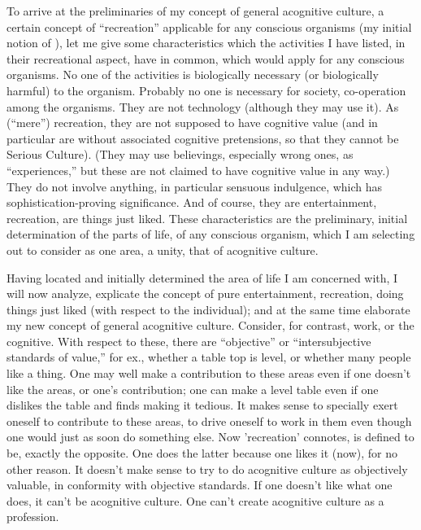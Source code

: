 To arrive at the preliminaries of my concept of general acognitive culture, a certain concept of \enquote{recreation} applicable for any conscious organisms (my initial notion of ), let me give some characteristics which the activities I have listed, in their recreational aspect, have in common, which would apply for any conscious organisms. No one of the activities is biologically necessary (or biologically harmful) to the organism. Probably no one is necessary for society, co-operation among the organisms. They are not technology (although they may use it). As (\enquote{mere}) recreation, they are not supposed to have cognitive value (and in particular are without associated cognitive pretensions, so that they cannot be Serious Culture). (They may use believings, especially wrong ones, as \enquote{experiences,} but these are not claimed to have cognitive value in any way.) They do not involve anything, in particular sensuous indulgence, which has sophistication-proving significance. And of course, they are entertainment, recreation, are things just liked. These characteristics are the preliminary, initial determination of the parts of life, of any conscious organism, which I am selecting out to consider as one area, a unity, that of acognitive culture.

Having located and initially determined the area of life I am concerned with, I will now analyze, explicate the concept of pure entertainment, recreation, doing things just liked (with respect to the individual); and at the same time elaborate my new concept of general acognitive culture. Consider, for contrast, work, or the cognitive. With respect to these, there are \enquote{objective} or \enquote{intersubjective standards of value,} for ex., whether a table top is level, or whether many people like a thing. One may well make a contribution to these areas even if one doesn't like the areas, or one's contribution; one can make a level table even if one dislikes the table and finds making it tedious. It makes sense to specially exert oneself to contribute to these areas, to drive oneself to work in them even though one would just as soon do something else. Now 'recreation' connotes,  is defined to be, exactly the opposite. One does the latter because one likes it (now), for no other reason. It doesn't make sense to try to do acognitive culture as objectively valuable, in conformity with objective standards. If one doesn't like what one does, it can't be acognitive culture. One can't create acognitive culture as a profession.

